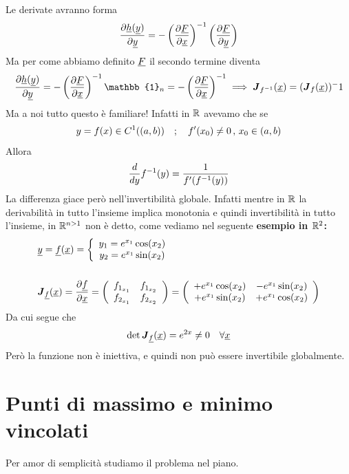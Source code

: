 Le derivate avranno forma
\begin{align}
	\frac{\partial \underline{h}(\underline{y})}{\partial \underline{y}} = -\left( \frac{\partial \underline{F}}{\partial \underline{x}} \right)^{-1}\left( \frac{\partial \underline{F}}{\partial \underline{y}} \right)
\end{align}
Ma per come abbiamo definito $\underline{F}$ il secondo termine diventa
\begin{align}
	\partialder{\vech(\vecy)}{\vecy} = -\left( \partialder{\vecF}{\vecx} \right)^{-1} \mathbb{1}_n = -\left( \partialder{\vecF}{\vecx} \right)^{-1} \implies \jacobian{f^{-1}}{\vecx}= (\jacobian{f}{\vecx})^-1
\end{align}
Ma a noi tutto questo è familiare! Infatti in $\mathbb{R}$ avevamo che se
\begin{align}
	y=f(x)\in C^1((a,b)) \quad ; \quad f'(x_0)\neq 0 \, , \, x_0\in (a,b)
\end{align}
Allora 
\begin{align}
	\frac{d }{d y}f^{-1}(y)= \frac{1}{f'(f^{-1}(y))}
\end{align}
La differenza giace però nell'invertibilità globale. Infatti mentre in $\mathbb{R}$ la derivabilità in tutto l'insieme implica monotonia e quindi invertibilità in tutto l'insieme, in $\mathbb{R}^{n>1}$ non è detto, come vediamo nel seguente \textbf{esempio in $\mathbb{R}^2$:}
\begin{align}
	{}&\underline{y} = \underline{f}(\underline{x})= \left\{\begin{array}{cc} y_1= e^{x_1} \cos(x_2) \\ y_2= e^{x_1} \sin(x_2) \end{array}\right.\\
	\nonumber \\
	& \boldsymbol{J}_{\underline{f}} (\underline{x})=\frac{\partial \underline{f}}{\partial \underline{x}}= \left( \begin{array}{ccc} f_{1_{x_1}} & f_{1_{x_2}} \\ f_{2_{x_1}} & f_{2_{x_2}} \end{array} \right) = \left( \begin{array}{ccc} +e^{x_1} \cos(x_2) & -e^{x_1} \sin(x_2) \\ +e^{x_1} \sin(x_2) & +e^{x_1} \cos(x_2) \end{array} \right)
\end{align}
Da cui segue che 
\begin{align}
	\det \boldsymbol{J}_{\underline{f}} (\underline{x})= e^{2x}\neq 0 \quad \forall \underline{x}
\end{align}
Però la funzione non è iniettiva, e quindi non può essere invertibile globalmente. 

\section{Punti di massimo e minimo vincolati}

Per amor di semplicità studiamo il problema nel piano.

